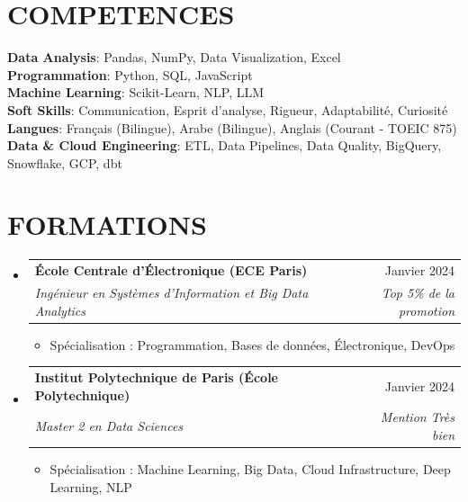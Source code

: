 \documentclass[11pt,a4paper]{article}
\makeatletter
\newcommand{\resumeItem}[1]{
  \item\footnotesize{
    {#1 \vspace{-1pt}}
  }
}
\newcommand{\resumeSubheading}[4]{
  \vspace{2pt}\item
    \begin{tabular*}{\textwidth}[t]{l@{\extracolsep{\fill}}r}
      {\footnotesize\textbf{#1}} & {\footnotesize#2} \\
      {\footnotesize\textit{#3}} & {\footnotesize\textit{#4}} \\
    \end{tabular*}\vspace{2pt}
}
\newcommand{\resumeSubHeadingListStart}{\begin{itemize}[leftmargin=0in, label={}]}
\newcommand{\resumeSubHeadingListEnd}{\end{itemize}}
\newcommand{\resumeItemListStart}{\begin{itemize}[label={\textbullet}]}
\newcommand{\resumeItemListEnd}{\end{itemize}\vspace{0pt}}
\makeatother
\begin{document}
\section{COMPETENCES}
\begin{itemize}[leftmargin=0in, label={}]
\footnotesize{\item{
{\footnotesize\textbf{Data Analysis}:} {\footnotesize Pandas, NumPy, Data Visualization, Excel} \\
\vspace{3pt}
{\footnotesize\textbf{Programmation}:} {\footnotesize Python, SQL, JavaScript} \\
\vspace{3pt}
{\footnotesize\textbf{Machine Learning}:} {\footnotesize Scikit-Learn, NLP, LLM} \\
\vspace{3pt}
{\footnotesize\textbf{Soft Skills}:} {\footnotesize Communication, Esprit d'analyse, Rigueur, Adaptabilité, Curiosité} \\
\vspace{3pt}
{\footnotesize\textbf{Langues}:} {\footnotesize Français (Bilingue), Arabe (Bilingue), Anglais (Courant - TOEIC 875)} \\
\vspace{3pt}
{\footnotesize\textbf{Data \& Cloud Engineering}:} {\footnotesize ETL, Data Pipelines, Data Quality, BigQuery, Snowflake, GCP, dbt}
}
}
\end{itemize}

\section{FORMATIONS}
\resumeSubHeadingListStart
    \resumeSubheading
      {École Centrale d'Électronique (ECE Paris)}
      {Janvier 2024}
      {Ingénieur en Systèmes d'Information et Big Data Analytics}
      {Top 5\% de la promotion}
      \resumeItemListStart
        \resumeItem{Spécialisation : Programmation, Bases de données, Électronique, DevOps}
      \resumeItemListEnd
    \resumeSubheading
      {Institut Polytechnique de Paris (École Polytechnique)}
      {Janvier 2024}
      {Master 2 en Data Sciences}
      {Mention Très bien}
      \resumeItemListStart
        \resumeItem{Spécialisation : Machine Learning, Big Data, Cloud Infrastructure, Deep Learning, NLP}
      \resumeItemListEnd
  \resumeSubHeadingListEnd
\end{document}
